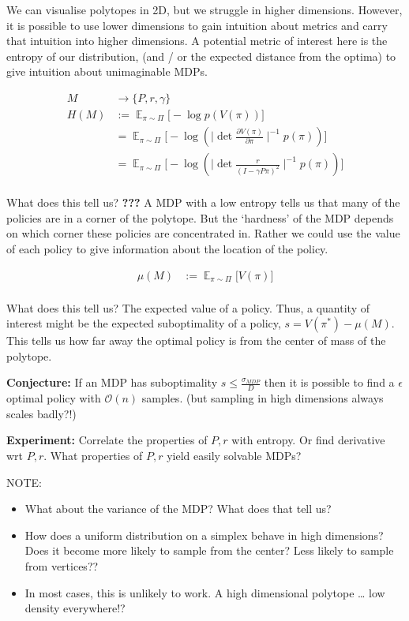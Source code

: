We can visualise polytopes in 2D, but we struggle in higher dimensions.
However, it is possible to use lower dimensions to gain intuition about
metrics and carry that intuition into higher dimensions. A potential
metric of interest here is the entropy of our distribution, (and / or
the expected distance from the optima) to give intuition about
unimaginable MDPs.

\begin{align}
M &\to \{P, r, \gamma\} \tag{a MDP}\\
H(M) &:= \mathop{\mathbb E}_{\pi\sim\Pi}\Big[-\log p(V(\pi)) \Big]\\
&= \mathop{\mathbb E}_{\pi\sim\Pi}\Big[-\log(\mid \det\frac{\partial V(\pi)}{\partial \pi}\mid^{-1}p(\pi)) \Big] \\
&= \mathop{\mathbb E}_{\pi\sim\Pi}\Big[-\log(\mid \det \frac{r}{(I-\gamma P \pi)^2}\mid^{-1}p(\pi)) \Big] \\
\end{align}

What does this tell us? \textbf{???} A MDP with a low entropy tells us
that many of the policies are in a corner of the polytope. But the
`hardness' of the MDP depends on which corner these policies are
concentrated in. Rather we could use the value of each policy to give
information about the location of the policy.

\begin{align*}
\mu(M) &:= \mathop{\mathbb E}_{\pi\sim\Pi}\Big[V(\pi) \Big]\\
\end{align*}

What does this tell us? The expected value of a policy. Thus, a quantity
of interest might be the expected suboptimality of a policy,
\(s = V(\pi^{* })-\mu(M)\). This tells us how far away the optimal
policy is from the center of mass of the polytope.

\textbf{Conjecture:} If an MDP has suboptimality
\(s \le \frac{\sigma_{MDP}}{D}\) then it is possible to find a
\(\epsilon\) optimal policy with \(\mathcal O(n)\) samples. (but
sampling in high dimensions always scales badly?!)

\textbf{Experiment:} Correlate the properties of \(P, r\) with entropy.
Or find derivative wrt \(P, r\). What properties of \(P, r\) yield
easily solvable MDPs?

NOTE:

\begin{itemize}
\item
  What about the variance of the MDP? What does that tell us?
\item
  How does a uniform distribution on a simplex behave in high
  dimensions? Does it become more likely to sample from the center? Less
  likely to sample from vertices??
\item
  In most cases, this is unlikely to work. A high dimensional polytope
  \ldots{} low density everywhere!?
\end{itemize}


